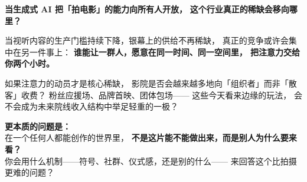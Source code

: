\documentclass[12pt, a4paper, openany]{book}
\newcommand{\key}[1]{\textbf{\color{AccentBlue}#1}}
\begin{document}
\vspace{20pt}
\begin{thoughtbox}

\textbf{当生成式 AI 把「拍电影」的能力向所有人开放，}
\textbf{这个行业真正的稀缺会移向哪里？}

\vspace{10pt}
{\small\color{DarkText}
当视听内容的生产门槛持续下降，银幕上的供给不再稀缺，
真正的竞争或许会集中在另一件事上：
\key{谁能让一群人，愿意在同一时间、同一空间里，
把注意力交给你两个小时。}

\vspace{8pt}
如果注意力的动员才是核心稀缺，
影院是否会越来越多地向「组织者」而非「散客」收费？
粉丝应援场、品牌首映、团体包场——
这些今天看来边缘的玩法，
会不会成为未来院线收入结构中举足轻重的一极？

\vspace{12pt}
\textbf{更本质的问题是：}\\
在一个任何人都能创作的世界里，
\textbf{不是这片能不能做出来，而是别人为什么要来看？}\\
你会用什么机制——符号、社群、仪式感，还是别的什么——
来回答这个比拍摄更难的问题？
}

\end{thoughtbox}
\end{document}
